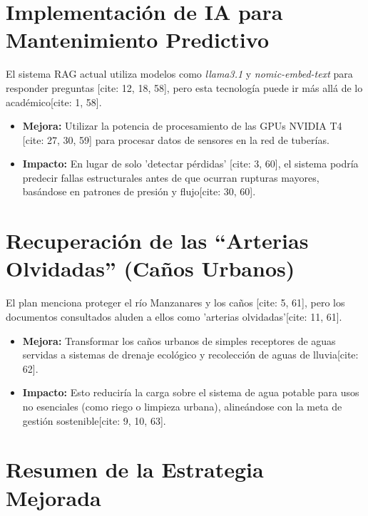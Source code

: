 \documentclass[12pt, a4paper]{article}
\begin{document}
\section{Implementación de IA para Mantenimiento Predictivo}
El sistema RAG actual utiliza modelos como \textit{llama3.1} y \textit{nomic-embed-text} para responder preguntas [cite: 12, 18, 58], pero esta tecnología puede ir más allá de lo académico[cite: 1, 58].

\begin{itemize}
    \item \textbf{Mejora:} Utilizar la potencia de procesamiento de las GPUs NVIDIA T4 [cite: 27, 30, 59] para procesar datos de sensores en la red de tuberías.
    \item \textbf{Impacto:} En lugar de solo 'detectar pérdidas' [cite: 3, 60], el sistema podría predecir fallas estructurales antes de que ocurran rupturas mayores, basándose en patrones de presión y flujo[cite: 30, 60].
\end{itemize}

\section{Recuperación de las ``Arterias Olvidadas'' (Caños Urbanos)}
El plan menciona proteger el río Manzanares y los caños [cite: 5, 61], pero los documentos consultados aluden a ellos como 'arterias olvidadas'[cite: 11, 61].

\begin{itemize}
    \item \textbf{Mejora:} Transformar los caños urbanos de simples receptores de aguas servidas a sistemas de drenaje ecológico y recolección de aguas de lluvia[cite: 62].
    \item \textbf{Impacto:} Esto reduciría la carga sobre el sistema de agua potable para usos no esenciales (como riego o limpieza urbana), alineándose con la meta de gestión sostenible[cite: 9, 10, 63].
\end{itemize}

\newpage
\section*{Resumen de la Estrategia Mejorada}
\end{document}
